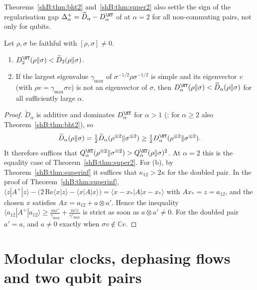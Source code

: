Theorems~\ref{shB:thm:bht2} and~\ref{shB:thm:super2} also settle the sign of the regularisation gap $\Delta^+_\alpha=\widetilde D_\alpha-D^\HT_\alpha$ of \cite[(45)]{Gour2026} at $\alpha=2$ for all non-commuting pairs, not only for qubits.

\begin{corollary}\label{shB:cor:strictgap}
Let $\rho,\sigma$ be faithful with $[\rho,\sigma]\ne0$.
\begin{enumerate}[label=(\alph*)]
\item $D^\HT_2(\rho\|\sigma)<\widetilde D_2(\rho\|\sigma)$.
\item If the largest eigenvalue $\gamma_{\max}$ of $\sigma^{-1/2}\rho\sigma^{-1/2}$ is simple and its eigenvector $v$ (with $\rho v=\gamma_{\max}\sigma v$) is not an eigenvector of $\sigma$, then $D^\HT_\alpha(\rho\|\sigma)<\widetilde D_\alpha(\rho\|\sigma)$ for all sufficiently large $\alpha$.
\end{enumerate}
\end{corollary}

\begin{proof}
$\widetilde D_\alpha$ is additive and dominates $D^\HT_\alpha$ for $\alpha>1$ (\cite{LiuHircheCheng2025}; for $\alpha\ge2$ also Theorem~\ref{shB:thm:bht2}), so
\[
\widetilde D_\alpha(\rho\|\sigma)=\tfrac12\widetilde D_\alpha(\rho^{\otimes2}\|\sigma^{\otimes2})\ge\tfrac12D^\HT_\alpha(\rho^{\otimes2}\|\sigma^{\otimes2}).
\] It therefore suffices that $Q^\HT_\alpha(\rho^{\otimes2}\|\sigma^{\otimes2})>Q^\HT_\alpha(\rho\|\sigma)^2$. At $\alpha=2$ this is the equality case of Theorem~\ref{shB:thm:super2}. For (b), by Theorem~\ref{shB:thm:superinf} it suffices that $\kappa_{12}>2\kappa$ for the doubled pair. In the proof of Theorem~\ref{shB:thm:superinf}, $\langle z|A^+|z\rangle-\big(2\,\mathrm{Re}\langle x|z\rangle-\langle x|A|x\rangle\big)=\langle x-x_*|A|x-x_*\rangle$ with $Ax_*=z=a_{12}$, and the chosen $x$ satisfies $Ax=a_{12}+a\otimes a'$. Hence the inequality $\langle a_{12}|A^+|a_{12}\rangle\ge\frac{mc'}{\gamma_{\max}}+\frac{m'c}{\gamma'_{\max}}$ is strict as soon as $a\otimes a'\ne0$. For the doubled pair $a'=a$, and $a\ne0$ exactly when $\sigma v\notin\mathbb Cv$.
\end{proof}

\section{Modular clocks, dephasing flows and two qubit pairs}\label{shB:sec:clocks}


